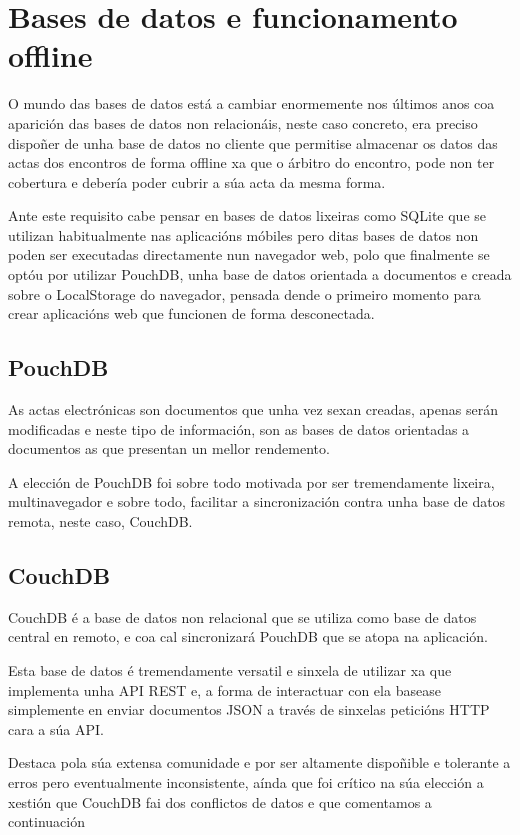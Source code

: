   \section{Bases de datos e funcionamento offline}
  O mundo das bases de datos está a cambiar enormemente nos últimos anos coa 
aparición das bases de datos non relacionáis, neste caso concreto, era preciso 
dispoñer de unha base de datos no cliente que permitise almacenar os 
datos das actas dos encontros de forma offline xa que o árbitro do encontro, 
pode non ter cobertura e debería poder cubrir a súa acta da mesma forma.

  Ante este requisito cabe pensar en bases de datos lixeiras como SQLite que 
se utilizan habitualmente nas aplicacións móbiles pero ditas bases de datos non 
poden ser executadas directamente nun navegador web, polo que finalmente se 
optóu por utilizar PouchDB, unha base de datos orientada a documentos e creada 
sobre o LocalStorage do navegador, pensada dende o primeiro momento para 
crear aplicacións web que funcionen de forma desconectada.

    \subsection{PouchDB}
    As actas electrónicas son documentos que unha vez sexan creadas, apenas 
serán modificadas e neste tipo de información, son as bases de datos orientadas 
a documentos as que presentan un mellor rendemento.

    A elección de PouchDB foi sobre todo motivada por ser tremendamente lixeira, 
multinavegador e sobre todo, facilitar a sincronización contra unha base de 
datos remota, neste caso, CouchDB.

    \subsection{CouchDB}
    CouchDB é a base de datos non relacional que se utiliza como base de datos 
central en remoto, e coa cal sincronizará PouchDB que se atopa 
na aplicación.

    Esta base de datos é tremendamente versatil e sinxela de utilizar xa que 
implementa unha API REST e, a forma de interactuar con ela basease simplemente 
en enviar documentos JSON a través de sinxelas peticións HTTP cara a súa API.

    Destaca pola súa extensa comunidade e por ser altamente dispoñible e 
tolerante a erros pero eventualmente inconsistente, aínda que foi crítico na 
súa elección a xestión que CouchDB fai dos conflictos de datos e que comentamos 
a continuación

